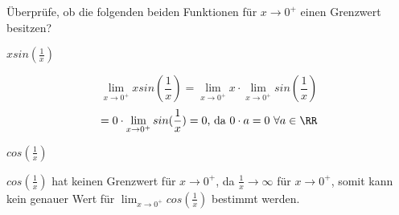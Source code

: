 Überprüfe, ob die folgenden beiden Funktionen für $x\to0^+$ einen Grenzwert besitzen?

\begin{minipage}[t]{0.49\textwidth}
    \begin{subtask}
        $xsin(\frac{1}{x})$
    \end{subtask}
    \begin{solution}
        \[
            \lim_{x\to0^+}xsin(\frac{1}{x})
            =\lim_{x\to0^+}x\cdot\lim_{x\to0^+}sin(\frac{1}{x})
        \]\[
            =0\cdot\lim_{x\to0^+}sin(\frac{1}{x})
            =0 \text{, da }0\cdot a = 0 \ \forall a \in \RR
        \]
    \end{solution}
\end{minipage} %
\begin{minipage}[t]{0.49\textwidth}
    \begin{subtask}
        $cos(\frac{1}{x})$
    \end{subtask}
    \begin{solution}
        $cos(\frac{1}{x})$ hat keinen Grenzwert für $x\to0^+$, da $\frac{1}{x}\to\infty$ für $x\to0^+$, somit kann kein genauer Wert für $\lim_{x\to0^+}cos(\frac{1}{x})$ bestimmt werden.
    \end{solution}
\end{minipage}
